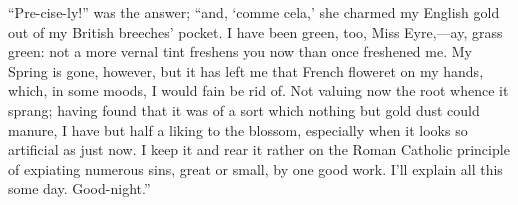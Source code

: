 \enquote{Pre-cise-ly!} was the answer; \enquote{and, \foreignquote{french}{comme
		cela,} she charmed my English gold out of my British breeches' pocket.
	I have been green, too, Miss Eyre,---ay, grass green: not a more vernal
	tint freshens you now than once freshened me. My Spring is gone,
	however, but it has left me that French floweret on my hands, which, in
	some moods, I would fain be rid of. Not valuing now the root whence it
	sprang; having found that it was of a sort which nothing but gold dust
	could manure, I have but half a liking to the blossom, especially when
	it looks so artificial as just now. I keep it and rear it rather on the
	Roman Catholic principle of expiating numerous sins, great or small, by
	one good work. I'll explain all this some day. Good-night.}
